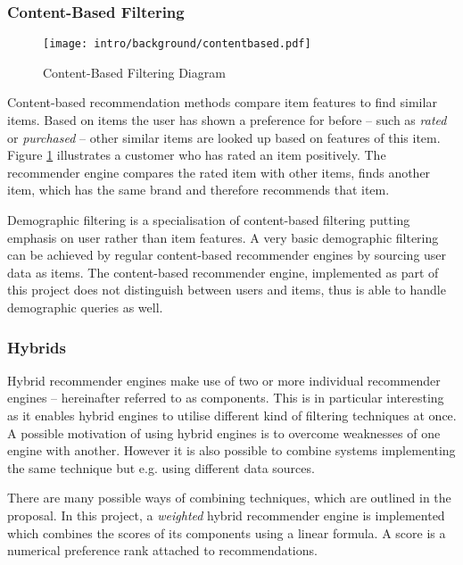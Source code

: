 \subsubsection{Content-Based Filtering}

\begin{figure}[ht]
    \texttt{[image: intro/background/contentbased.pdf]}
    \caption{Content-Based Filtering Diagram}
    \label{fig:intro-techniques-contentbased}
\end{figure}

Content-based recommendation methods compare item features to find similar items. Based on items the user has shown a preference for before -- such as \emph{rated} or \emph{purchased} -- other similar items are looked up based on features of this item. Figure \ref{fig:intro-techniques-contentbased} illustrates a customer who has rated an item positively. The recommender engine compares the rated item with other items, finds another item, which has the same brand and therefore recommends that item.

Demographic filtering is a specialisation of content-based filtering putting emphasis on user rather than item features. A very basic demographic filtering can be achieved by regular content-based recommender engines by sourcing user data as items. The content-based recommender engine, implemented as part of this project does not distinguish between users and items, thus is able to handle demographic queries as well.

\subsubsection{Hybrids}
\label{intro-bg-tech-hybrid}

Hybrid recommender engines make use of two or more individual recommender engines -- hereinafter referred to as components. This is in particular interesting as it enables hybrid engines to utilise different kind of filtering techniques at once. A possible motivation of using hybrid engines is to overcome weaknesses of one engine with another. However it is also possible to combine systems implementing the same technique but e.g. using different data sources.

There are many possible ways of combining techniques, which are outlined in the proposal. In this project, a \emph{weighted} hybrid recommender engine is implemented which combines the scores of its components using a linear formula. A score is a numerical preference rank attached to recommendations.

